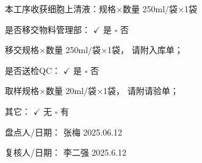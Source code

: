 \documentclass[UTF8,10pt,a4paper,fontset=fandol]{ctexart}
\newcommand{\fieldvalue}[1]{#1}
\newcommand{\handwritten}[1]{#1}
\begin{document}
\noindent
本工序收获细胞上清液：规格$\times$数量
\fieldvalue{\handwritten{250ml/袋$\times$1袋}}

\vspace{0.8em}

\noindent
是否移交物料管理部：
\fieldvalue{\(\checkmark\) 是}
\qquad
$\square$ 否

\vspace{0.8em}

\noindent
移交规格$\times$数量
\fieldvalue{\handwritten{250ml/袋$\times$1袋}}，
请附入库单；

\vspace{0.8em}

\noindent
是否送检QC：
\fieldvalue{\(\checkmark\) 是}
\qquad
$\square$ 否

\vspace{0.8em}

\noindent
取样规格$\times$数量
\fieldvalue{\handwritten{20ml/袋$\times$1袋}}，
请附请验单；

\vspace{0.8em}

\noindent
其它：
\fieldvalue{\(\checkmark\) 无}
\qquad
$\square$ 有\hspace{4em}

\vspace{0.8em}

\noindent
盘点人/日期：
\fieldvalue{\handwritten{张梅}}
\qquad
\fieldvalue{\handwritten{2025.06.12}}

\vspace{0.8em}

\noindent
复核人/日期：
\fieldvalue{\handwritten{李二强}}
\qquad
\fieldvalue{\handwritten{2025.6.12}}

\vfill
\end{document}
